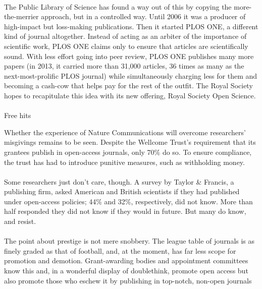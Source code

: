 \documentclass[a4paper, 12pt, UTF8]{article}
\begin{document}
\paragraph*{}
    The Public Library of Science has found a way out of this by copying the more-the-merrier approach, but in a controlled way. Until 2006 it was a producer of high-impact but loss-making publications. Then it started PLOS ONE, a different kind of journal altogether. Instead of acting as an arbiter of the importance of scientific work, PLOS ONE claims only to ensure that articles are scientifically sound. With less effort going into peer review, PLOS ONE publishes many more papers (in 2013, it carried more than 31,000 articles, 36 times as many as the next-most-prolific PLOS journal) while simultaneously charging less for them and becoming a cash-cow that helps pay for the rest of the outfit. The Royal Society hopes to recapitulate this idea with its new offering, Royal Society Open Science.

\paragraph*{}
    \begin{bfseries}
        \large
        Free hits
    \end{bfseries}

    Whether the experience of Nature Communications will overcome researchers’ misgivings remains to be seen. Despite the Wellcome Trust’s requirement that its grantees publish in open-access journals, only 70\% do so. To ensure compliance, the trust has had to introduce punitive measures, such as withholding money.

\paragraph*{}
    Some researchers just don’t care, though. A survey by Taylor \& Francis, a publishing firm, asked American and British scientists if they had published under open-access policies; 44\% and 32\%, respectively, did not know. More than half responded they did not know if they would in future. But many do know, and resist.

\paragraph*{}
    The point about prestige is not mere snobbery. The league table of journals is as finely graded as that of football, and, at the moment, has far less scope for promotion and demotion. Grant-awarding bodies and appointment committees know this and, in a wonderful display of doublethink, promote open access but also promote those who eschew it by publishing in top-notch, non-open journals
\end{document}
